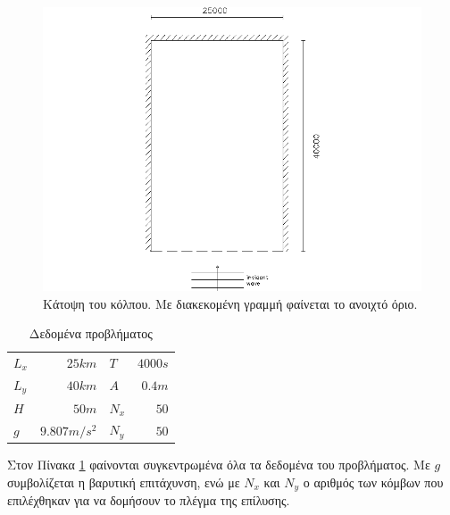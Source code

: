 \begin{figure}[]
	\centering
	\includegraphics[scale=1.3]{images/layout.png}
	\caption{Κάτοψη του κόλπου. Με διακεκομένη γραμμή φαίνεται το ανοιχτό όριο.}
	\label{fig:layout}
\end{figure}

\begin{table}[h!]
    \centering
    \begin{tabular}{|l|r|l|r|}
        \hline
        \textbf{$L_x$} & $25km$ & \textbf{$T$} & $4000s$ \\
        \textbf{$L_y$} & $40km$ & \textbf{$A$} & $0.4m$ \\
        \textbf{$H$} & $50m$ & \textbf{$N_x$} & $50$ \\
        \textbf{$g$} & $9.807 m/s^2$ & \textbf{$N_y$} & $50$ \\
        \hline
    \end{tabular}
    \caption{Δεδομένα προβλήματος}
    \label{tab:in-data}
\end{table}

Στον Πίνακα \ref{tab:in-data} φαίνονται συγκεντρωμένα όλα τα δεδομένα του προβλήματος. Με $g$ συμβολίζεται η βαρυτική επιτάχυνση, ενώ με $N_x$ και $N_y$ ο αριθμός των κόμβων που επιλέχθηκαν για να δομήσουν το πλέγμα της επίλυσης. 

